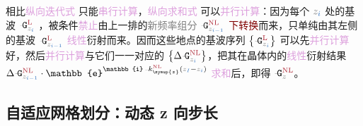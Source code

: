 相比\textcolor{Plum}{纵向迭代式}  只能\textcolor{Plum}{串行计算}，\textcolor{Plum}{纵向求和式}  可以\textcolor{Plum}{并行计算}：因为每个 $\mathcolor{gray}{z_{\textcolor{NavyBlue}{i}}}$ 处的\textcolor{NavyBlue}{基波} $\xint{\mathcolor{gray}{-}}{16}{\mathtt{G}}^{\text{\textcolor{Maroon}{L}}}_{\mathcolor{gray}{z_{\textcolor{NavyBlue}{i}}}}$ ，被条件\textcolor{Plum}{禁止}由上一排的\textcolor{gray}{新频率组分} $\xint{\mathcolor{gray}{-}}{16}{\mathtt{G}}^{\text{\textcolor{Maroon}{NL}}}_{\mathcolor{gray}{z_{\textcolor{NavyBlue}{i-1}}}}$ \textcolor{Maroon}{下转换}而来，只单纯由其左侧的\textcolor{NavyBlue}{基波} $\xint{\mathcolor{gray}{-}}{16}{\mathtt{G}}^{\text{\textcolor{Maroon}{L}}}_{\mathcolor{gray}{z_{\textcolor{NavyBlue}{i-1}}}}$ \textcolor{Plum}{线性}\textcolor{NavyBlue}{衍射}而来。因而这些地点的\textcolor{NavyBlue}{基波}序列 $\left\{ \xint{\mathcolor{gray}{-}}{16}{\mathtt{G}}^{\text{\textcolor{Maroon}{L}}}_{\mathcolor{gray}{z_{\textcolor{NavyBlue}{i}}}} \right\}$ 可以先\textcolor{Plum}{并行计算}好，然后\textcolor{Plum}{并行计算}与它们一一对应的 $\left\{ \Delta \xint{\mathcolor{gray}{-}}{16}{\mathtt{G}}^{\text{\textcolor{Maroon}{NL}}}_{\mathcolor{gray}{z_{\textcolor{NavyBlue}{i}}}} \right\}$，把其在\textcolor{PineGreen}{晶体}内的\textcolor{Plum}{线性}\textcolor{NavyBlue}{衍射}结果 $\Delta \xint{\mathcolor{gray}{-}}{16}{\mathtt{G}}^{\text{\textcolor{Maroon}{NL}}}_{\mathcolor{gray}{z_{\textcolor{NavyBlue}{i-1}}}} \cdot \mathbb{e}^{\mathbb{i} \xint{\begin{smallmatrix} ~ \\ {}^{}_{\mathcolor{gray}{-}} \\ ~ \end{smallmatrix}}{15}{k}^{\text{\textcolor{Maroon}{NL}}}_{\symup{z}} \left( \mathcolor{gray}{z_{\textcolor{NavyBlue}{I}}} - \mathcolor{gray}{z_{\textcolor{NavyBlue}{i}}} \right)}$ \textcolor{Plum}{求和}后，即得  $\xint{\mathcolor{gray}{-}}{16}{\mathtt{G}}^{\text{\textcolor{Maroon}{NL}}}_{\mathcolor{gray}{z}}$。

\subsection{自适应网格划分：动态 z 向步长}\label{ssec:NL_z-step}

